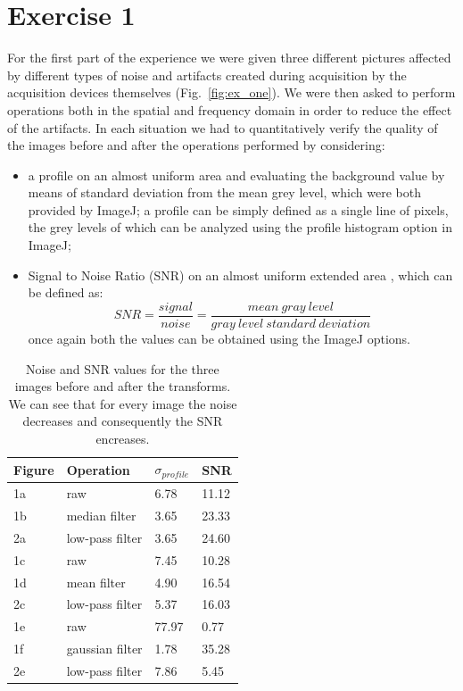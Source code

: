 \documentclass[a4paper]{article}
\begin{document}
\section*{Exercise 1}
For the first part of the experience we were given three different pictures affected by different types of noise and artifacts created during acquisition by the acquisition devices themselves (Fig.~\ref{fig:ex_one}). We were then asked to perform operations both in the spatial and frequency domain in order to reduce the effect of the artifacts. In each situation we had to quantitatively verify the quality of the images before and after the operations performed by considering:
\begin{itemize}
 \item a profile on an almost uniform area and evaluating the background value by means of standard deviation from the mean grey level, which were both provided by ImageJ; a profile can be simply defined as a single line of pixels, the grey levels of which can be analyzed using the profile histogram option in ImageJ;
 \item Signal to Noise Ratio (SNR) on an almost uniform extended area , which can be defined as:
 \begin{equation}
 SNR=\frac{signal}{noise}=\frac{mean\ gray\ level}{gray\ level\ standard\ deviation}
 \end{equation}
 once again both the values can be obtained using the ImageJ options.
\end{itemize}

\begin{table}[h]
	\centering
	\begin{tabular}{| l | l | l | l |}
		\hline
		Figure & Operation & $\sigma_{profile}$ & SNR \\ \hline
		1a & raw & 6.78 & 11.12 \\ \hline
		1b & median filter & 3.65 & 23.33 \\ \hline
		2a & low-pass filter & 3.65 & 24.60 \\ \hline
		1c & raw & 7.45 & 10.28 \\ \hline
		1d & mean filter & 4.90 & 16.54 \\ \hline
		2c & low-pass filter & 5.37 & 16.03 \\ \hline
		1e & raw & 77.97 & 0.77 \\ \hline
		1f & gaussian filter & 1.78 & 35.28 \\ \hline
		2e & low-pass filter & 7.86 & 5.45 \\ \hline
	\end{tabular}
  \caption{Noise and SNR values for the three images before and after the transforms. We can see that for every image the noise decreases and consequently the SNR encreases.}
  \label{tab:ex_one}
\end{table}
\end{document}
